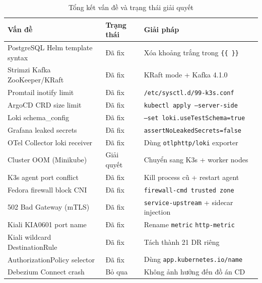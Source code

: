 \begin{table}[H]
  \centering
  \caption{Tổng kết vấn đề và trạng thái giải quyết}
  \begin{tabularx}{\textwidth}{L{5cm}L{3cm}X}
    \toprule
    \textbf{Vấn đề} & \textbf{Trạng thái} & \textbf{Giải pháp} \\
    \midrule
    PostgreSQL Helm template syntax & Đã fix & Xóa khoảng trắng trong \texttt{\{\{ \}\}} \\
    Strimzi Kafka ZooKeeper/KRaft & Đã fix & KRaft mode + Kafka 4.1.0 \\
    Promtail inotify limit & Đã fix & \texttt{/etc/sysctl.d/99-k3s.conf} \\
    ArgoCD CRD size limit & Đã fix & \texttt{kubectl apply --server-side} \\
    Loki schema\_config & Đã fix & \texttt{--set loki.useTestSchema=true} \\
    Grafana leaked secrets & Đã fix & \texttt{assertNoLeakedSecrets=false} \\
    OTel Collector loki receiver & Đã fix & Dùng \texttt{otlphttp/loki} exporter \\
    Cluster OOM (Minikube) & Giải quyết & Chuyển sang K3s + worker nodes \\
    K3s agent port conflict & Đã fix & Kill process cũ + restart agent \\
    Fedora firewall block CNI & Đã fix & \texttt{firewall-cmd trusted zone} \\
    502 Bad Gateway (mTLS) & Đã fix & \texttt{service-upstream} + sidecar injection \\
    Kiali KIA0601 port name & Đã fix & Rename \texttt{metric} \textrightarrow{} \texttt{http-metric} \\
    Kiali wildcard DestinationRule & Đã fix & Tách thành 21 DR riêng \\
    AuthorizationPolicy selector & Đã fix & Dùng \texttt{app.kubernetes.io/name} \\
    Debezium Connect crash & Bỏ qua & Không ảnh hưởng đến đồ án CD \\
    \bottomrule
  \end{tabularx}
\end{table}
